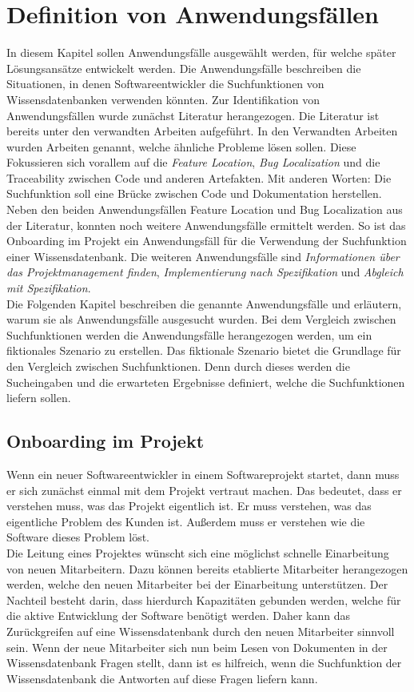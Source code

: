 \chapter{Definition von Anwendungsfällen}
In diesem Kapitel sollen Anwendungsfälle ausgewählt werden, für welche später Lösungsansätze entwickelt werden.
Die Anwendungsfälle beschreiben die Situationen, in denen Softwareentwickler die Suchfunktionen von Wissensdatenbanken verwenden könnten.
Zur Identifikation von Anwendungsfällen wurde zunächst Literatur herangezogen.
Die Literatur ist bereits unter den verwandten Arbeiten aufgeführt.
In den Verwandten Arbeiten wurden Arbeiten genannt, welche ähnliche Probleme lösen sollen.
Diese Fokussieren sich vorallem auf die \textit{Feature Location}, \textit{Bug Localization} und die Traceability zwischen Code und anderen Artefakten.
Mit anderen Worten: Die Suchfunktion soll eine Brücke zwischen Code und Dokumentation herstellen.
Neben den beiden Anwendungsfällen Feature Location und Bug Localization aus der Literatur, konnten noch weitere Anwendungsfälle ermittelt werden.
So ist das Onboarding im Projekt ein Anwendungsfäll für die Verwendung der Suchfunktion einer Wissensdatenbank.
Die weiteren Anwendungsfälle sind \textit{Informationen über das Projektmanagement finden}, \textit{Implementierung nach Spezifikation} und \textit{Abgleich mit Spezifikation}.\\
Die Folgenden Kapitel beschreiben die genannte Anwendungsfälle und erläutern, warum sie als Anwendungsfälle ausgesucht wurden.
Bei dem Vergleich zwischen Suchfunktionen werden die Anwendungsfälle herangezogen werden, um ein fiktionales Szenario zu erstellen.
Das fiktionale Szenario bietet die Grundlage für den Vergleich zwischen Suchfunktionen.
Denn durch dieses werden die Sucheingaben und die erwarteten Ergebnisse definiert, welche die Suchfunktionen liefern sollen.

\section{Onboarding im Projekt}
Wenn ein neuer Softwareentwickler in einem Softwareprojekt startet, dann muss er sich zunächst einmal mit dem Projekt vertraut machen.
Das bedeutet, dass er verstehen muss, was das Projekt eigentlich ist.
Er muss verstehen, was das eigentliche Problem des Kunden ist.
Außerdem muss er verstehen wie die Software dieses Problem löst.\\

Die Leitung eines Projektes wünscht sich eine möglichst schnelle Einarbeitung von neuen Mitarbeitern.
Dazu können bereits etablierte Mitarbeiter herangezogen werden, welche den neuen Mitarbeiter bei der Einarbeitung unterstützen.
Der Nachteil besteht darin, dass hierdurch Kapazitäten gebunden werden, welche für die aktive Entwicklung der Software benötigt werden.
Daher kann das Zurückgreifen auf eine Wissensdatenbank durch den neuen Mitarbeiter sinnvoll sein.
Wenn der neue Mitarbeiter sich nun beim Lesen von Dokumenten in der Wissensdatenbank Fragen stellt, dann ist es hilfreich, wenn die Suchfunktion der Wissensdatenbank die Antworten auf diese Fragen liefern kann.\\

